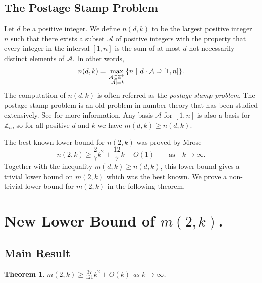 \documentclass[11pt]{article}
\newtheorem{theorem}{Theorem}[section]
\theoremstyle{definition}
\def\Z{\mbox{$\mathbb Z$}}
\begin{document}
\subsection{The Postage Stamp Problem}
 Let $d$ be a positive integer. We define $n(d, k)$ to be the largest positive integer $n$ such that there exists a subset $\mathcal{A}$ of positive integers with the property that every integer in the interval $[1, n]$ is the sum of at most $d$ not necessarily distinct elements of $\mathcal{A}$. In other words, 
\[
n(d, k) = \max_{\scriptstyle \mathcal{A}\subseteq\mathbb Z^{+}\atop\scriptstyle |\mathcal{A}|=k}\{n\  |\ d\cdot \mathcal{A}\supseteq[1, n]\}.
\]
The computation of  $n(d, k)$ is often referred as the \emph{postage stamp problem}. The postage stamp problem is an old problem in number theory that has been studied extensively. See  for more information. Any basis $\mathcal{A}$ for $[1, n]$ is also a basis for $\Z_n$, so for all positive $d$ and $k$ we have $m(d, k) \geq n(d, k)$.

The  best known lower bound for $n(2,k)$ was proved by Mrose \cite{Mrose1979}
\[
n(2, k) \geq \frac{2}{7}k^2 + \frac{12}{7}k + O(1)\qquad  \text{as}\quad  k \to \infty.
\]
Together with the inequality $m(d, k) \geq n(d, k)$, this lower bound gives a trivial lower bound on $m(2, k)$ which was the best known. We prove a non-trivial lower bound for $m(2,k)$ in the following theorem.

 
\section{New Lower Bound of $m(2, k)$.}
\subsection{Main Result}

 
\begin{theorem}
$\displaystyle m(2,k) \geq \frac{37}{121}k^2 + O(k)$  as $ k \to \infty$.
\end{theorem}
\end{document}
